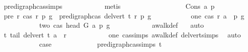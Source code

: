 \begin{isabellebody}
\ pre{\isacharunderscore}{\kern0pt}digraph{\isachardot}{\kern0pt}cas{\isachardot}{\kern0pt}simps{\isacharparenleft}{\kern0pt}{}{\isacharparenright}{\kern0pt}\isanewline
\ \ \ \ \ \ \ \ \ \ \isamarkupfalse%
\ {\isacharparenleft}{\kern0pt}metis{\isacharparenright}{\kern0pt}\ \ \isanewline
\ \ \ \ \ \ \isamarkupfalse%
\isanewline
\ \ \ \ \ \ \ \ \isamarkupfalse%
\ {\isacharparenleft}{\kern0pt}Cons\ a\ p{\isacharparenright}{\kern0pt}\isanewline
\ \ \ \ \ \ \ \ \isamarkupfalse%
\ pre{\isacharcolon}{\kern0pt}\ {\isachardoublequoteopen}{\isasymAnd}r{\isachardot}{\kern0pt}\ {\isacharparenleft}{\kern0pt}cas\ r\ p\ g\ {\isasymLongrightarrow}\ pre{\isacharunderscore}{\kern0pt}digraph{\isachardot}{\kern0pt}cas\ {\isacharparenleft}{\kern0pt}del{\isacharunderscore}{\kern0pt}vert\ t{\isacharparenright}{\kern0pt}\ r\ p\ g{\isacharparenright}{\kern0pt}{\isachardoublequoteclose}\isanewline
\ \ \ \ \ \ \ \ \ \ \ one{\isacharcolon}{\kern0pt}\ {\isachardoublequoteopen}cas\ r\ {\isacharparenleft}{\kern0pt}a\ {\isacharhash}{\kern0pt}\ p{\isacharparenright}{\kern0pt}\ g{\isachardoublequoteclose}\isanewline
\ \ \ \ \ \ \ \ \isamarkupfalse%
\ \isamarkupfalse%
\ two{\isacharcolon}{\kern0pt}\ {\isachardoublequoteopen}cas\ {\isacharparenleft}{\kern0pt}head\ G\ a{\isacharparenright}{\kern0pt}\ p\ g{\isachardoublequoteclose}\isanewline
\ \ \ \ \ \ \ \ \ \ \isamarkupfalse%
\ awalk{\isacharunderscore}{\kern0pt}def\ \ \isamarkupfalse%
\ auto\isanewline
\ \ \ \ \ \ \ \ \isamarkupfalse%
\ \isamarkupfalse%
\ t{\isacharcolon}{\kern0pt}\ {\isachardoublequoteopen}tail\ {\isacharparenleft}{\kern0pt}del{\isacharunderscore}{\kern0pt}vert\ t{\isacharparenright}{\kern0pt}\ a\ {\isacharequal}{\kern0pt}\ r{\isachardoublequoteclose}\isanewline
\ \ \ \ \ \ \ \ \ \ \isamarkupfalse%
\ one\ cas{\isachardot}{\kern0pt}simps\ awalk{\isacharunderscore}{\kern0pt}def\ del{\isacharunderscore}{\kern0pt}vert{\isacharunderscore}{\kern0pt}simps{\isacharparenleft}{\kern0pt}{}{\isacharparenright}{\kern0pt}\ \isamarkupfalse%
\ auto\isanewline
\ \ \ \ \ \ \ \ \isamarkupfalse%
\ \isamarkupfalse%
\ {\isacharquery}{\kern0pt}case\ \isanewline
\ \ \ \ \ \ \ \ \ \ \isamarkupfalse%
\ pre{\isacharunderscore}{\kern0pt}digraph{\isachardot}{\kern0pt}cas{\isachardot}{\kern0pt}simps{\isacharparenleft}{\kern0pt}{}{\isacharparenright}{\kern0pt}\ t\isanewline

\end{isabellebody}
